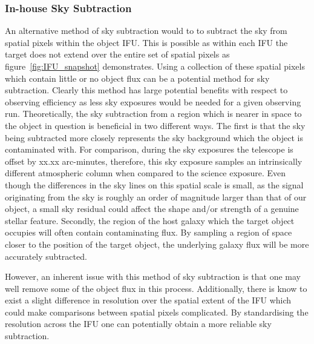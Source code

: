 \subsubsection{In-house Sky Subtraction} %
\label{sub:in_house_sky_subtraction}

An alternative method of sky subtraction would to to subtract the sky from spatial pixels within the object IFU.
This is possible as within each IFU the target does not extend over the entire set of spatial pixels as figure~\ref{fig:IFU_snapshot} demonstrates.
Using a collection of these spatial pixels which contain little or no object flux can be a potential method for sky subtraction.
Clearly this method has large potential benefits with respect to observing efficiency as less sky exposures would be needed for a given observing run.
Theoretically, the sky subtraction from a region which is nearer in space to the object in question is beneficial in two different ways.
The first is that the sky being subtracted more closely represents the sky background which the object is contaminated with.
For comparison, during the sky exposures the telescope is offset by xx.xx arc-minutes, therefore, this sky exposure samples an intrinsically different atmospheric column when compared to the science exposure.
Even though the differences in the sky lines on this spatial scale is small, as the signal originating from the sky is roughly an order of magnitude larger than that of our object, a small sky residual could affect the shape and/or strength of a genuine stellar feature.
Secondly, the region of the host galaxy which the target object occupies will often contain contaminating flux.
By sampling a region of space closer to the position of the target object, the underlying galaxy flux will be more accurately subtracted.

However, an inherent issue with this method of sky subtraction is that one may well remove some of the object flux in this process.
Additionally, there is know to exist a slight difference in resolution over the spatial extent of the IFU
\citep{2015ApJ...798...23L} which could make comparisons between spatial pixels complicated.
By standardising the resolution across the IFU one can potentially obtain a more reliable sky subtraction.


